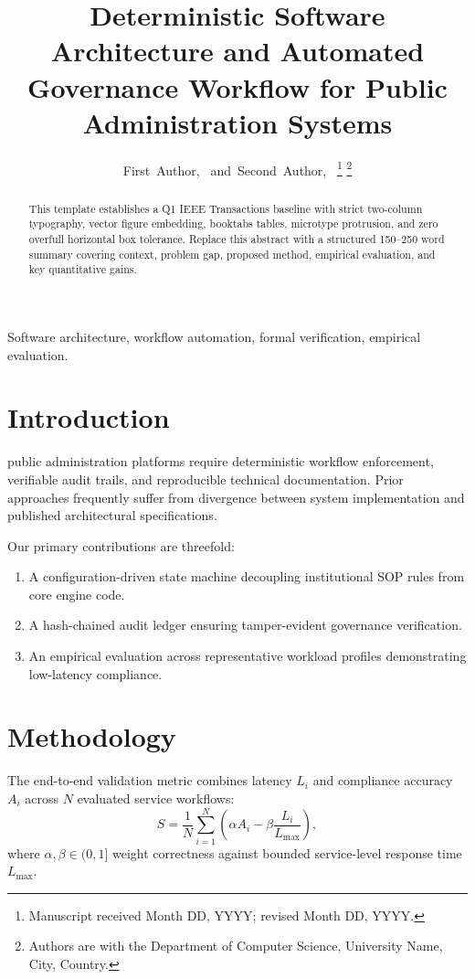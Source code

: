 \documentclass[journal]{IEEEtran}
\begin{document}
\title{Deterministic Software Architecture and Automated Governance Workflow for Public Administration Systems}

\author{First~Author,~
        and~Second~Author,~%
\thanks{Manuscript received Month DD, YYYY; revised Month DD, YYYY.}%
\thanks{Authors are with the Department of Computer Science, University Name, City, Country.}}

\maketitle

\begin{abstract}
This template establishes a Q1 IEEE Transactions baseline with strict two-column typography, vector figure embedding, booktabs tables, microtype protrusion, and zero overfull horizontal box tolerance. Replace this abstract with a structured 150--250 word summary covering context, problem gap, proposed method, empirical evaluation, and key quantitative gains.
\end{abstract}

\begin{IEEEkeywords}
Software architecture, workflow automation, formal verification, empirical evaluation.
\end{IEEEkeywords}

\section{Introduction}
 public administration platforms require deterministic workflow enforcement, verifiable audit trails, and reproducible technical documentation. Prior approaches frequently suffer from divergence between system implementation and published architectural specifications.

Our primary contributions are threefold:
\begin{enumerate}
  \item A configuration-driven state machine decoupling institutional SOP rules from core engine code.
  \item A hash-chained audit ledger ensuring tamper-evident governance verification.
  \item An empirical evaluation across representative workload profiles demonstrating low-latency compliance.
\end{enumerate}

\section{Methodology}
The end-to-end validation metric combines latency $L_i$ and compliance accuracy $A_i$ across $N$ evaluated service workflows:
\begin{equation}
  S = \frac{1}{N} \sum_{i=1}^{N} \left( \alpha A_i - \beta \frac{L_i}{L_{\max}} \right),
  \label{eq:score}
\end{equation}
where $\alpha, \beta \in (0, 1]$ weight correctness against bounded service-level response time $L_{\max}$.
\end{document}
